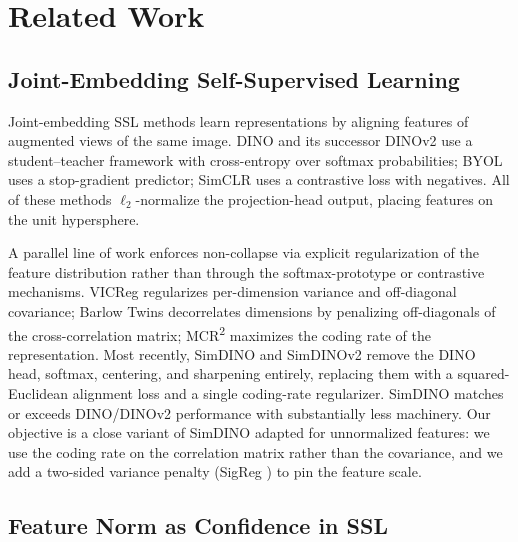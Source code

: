 \section{Related Work}
\label{sec:related_work}

\subsection{Joint-Embedding Self-Supervised Learning}

Joint-embedding SSL methods learn representations by aligning features of augmented views of the same image. DINO \citep{caron2021emerging} and its successor DINOv2 \citep{oquab2023dinov2} use a student--teacher framework with cross-entropy over softmax probabilities; BYOL \citep{grill2020byol} uses a stop-gradient predictor; SimCLR \citep{chen2020simclr} uses a contrastive loss with negatives. All of these methods $\ell_2$-normalize the projection-head output, placing features on the unit hypersphere.

A parallel line of work enforces non-collapse via explicit regularization of the feature distribution rather than through the softmax-prototype or contrastive mechanisms. VICReg \citep{bardes2022vicreg} regularizes per-dimension variance and off-diagonal covariance; Barlow Twins \citep{zbontar2021barlow} decorrelates dimensions by penalizing off-diagonals of the cross-correlation matrix; MCR\textsuperscript{2} \citep{yu2020mcr2} maximizes the coding rate \citep{ma2007segmentation} of the representation. Most recently, SimDINO and SimDINOv2 \citep{wu2025simdino} remove the DINO head, softmax, centering, and sharpening entirely, replacing them with a squared-Euclidean alignment loss and a single coding-rate regularizer. SimDINO matches or exceeds DINO/DINOv2 performance with substantially less machinery. Our objective is a close variant of SimDINO adapted for unnormalized features: we use the coding rate on the correlation matrix \citep{kacker2025correlation_rate} rather than the covariance, and we add a two-sided variance penalty (SigReg \citep{schaeffer2024sigreg}) to pin the feature scale.

\subsection{Feature Norm as Confidence in SSL}

